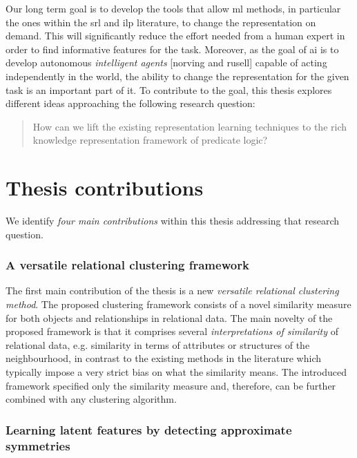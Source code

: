 Our long term goal is to develop the tools that allow \gls{ml} methods, in particular the ones within the \gls{srl} and \gls{ilp} literature, to change the representation on demand.
This will significantly reduce the effort needed from a human expert in order to find informative features for the task.
Moreover, as the goal of \gls{ai} is to develop autonomous \textit{intelligent agents} [norving and rusell] capable of acting independently in the world, the ability to change the representation for the given task is an important part of it.
To contribute to the goal, this thesis explores different ideas approaching the following research question: 

\begin{quote}
	How can we lift the existing representation learning techniques to the rich knowledge representation framework of predicate logic?
\end{quote}








\section{Thesis contributions}




We identify \textit{four main contributions} within this thesis addressing that research question.



\subsubsection{A versatile relational clustering framework}

The first main contribution of the thesis is a new \textit{versatile relational clustering method}.
The proposed clustering framework consists of a novel similarity measure for both objects and relationships in relational data.
The main novelty of the proposed framework is that it comprises several \textit{interpretations of similarity} of relational data, e.g. similarity in terms of attributes or structures of the neighbourhood, in contrast to the existing methods in the literature which typically impose a very strict bias on what the similarity means.
The introduced framework specified only the similarity measure and, therefore, can be further combined with any clustering algorithm.




\subsubsection{Learning latent features by detecting approximate symmetries}


